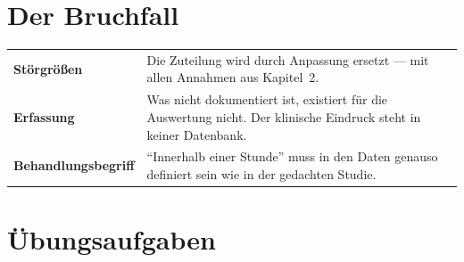 \section{Der Bruchfall}

\begin{warnung}
\begin{center}
{\small
\renewcommand{\arraystretch}{1.52}
\begin{tabular}{@{}P{3.0cm}P{5.6cm}@{}}
\toprule
\textbf{Störgrößen} & Die Zuteilung wird durch Anpassung ersetzt --- mit allen Annahmen aus Kapitel~2.\\
\textbf{Erfassung} & Was nicht dokumentiert ist, existiert für die Auswertung nicht. Der klinische Eindruck steht in keiner Datenbank.\\
\textbf{Behandlungs\-begriff} & \enquote{Innerhalb einer Stunde} muss in den Daten genauso definiert sein wie in der gedachten Studie.\\
\bottomrule
\end{tabular}}
\end{center}

\begin{center}
\begin{minipage}{0.88\textwidth}
\end{minipage}
\end{center}
\end{warnung}

\section{Übungsaufgaben}

